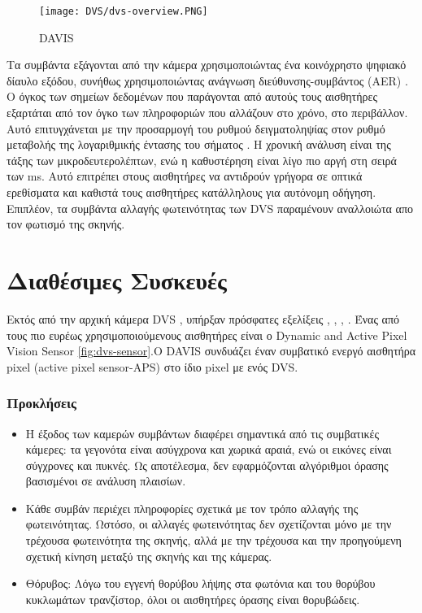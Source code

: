\documentclass[12pt]{report}
\begin{document}
\begin{wrapfigure}{r}{0.5\textwidth} %
    \centering
     \texttt{[image: DVS/dvs-overview.PNG]}
    \caption{\textlatin{DAVIS}}
    \label{fig:dvs-overview}
\end{wrapfigure}
Τα συμβάντα εξάγονται από την κάμερα χρησιμοποιώντας ένα κοινόχρηστο ψηφιακό δίαυλο εξόδου, συνήθως χρησιμοποιώντας ανάγνωση διεύθυνσης-συμβάντος (\textlatin{AER}) \cite{boahen2004} \cite{liu2015}. Ο όγκος των σημείων δεδομένων που παράγονται από αυτούς τους αισθητήρες εξαρτάται από τον όγκο των πληροφοριών που αλλάζουν στο χρόνο, στο περιβάλλον. Αυτό επιτυγχάνεται με την προσαρμογή του ρυθμού δειγματοληψίας στον ρυθμό μεταβολής της λογαριθμικής έντασης του σήματος . Η χρονική ανάλυση είναι της τάξης των μικροδευτερολέπτων, ενώ η καθυστέρηση είναι λίγο πιο αργή στη σειρά των \textlatin{ms}. Αυτό επιτρέπει στους αισθητήρες να αντιδρούν γρήγορα σε οπτικά ερεθίσματα και καθιστά τους αισθητήρες κατάλληλους για αυτόνομη οδήγηση. Επιπλέον, τα συμβάντα αλλαγής φωτεινότητας των \textlatin{DVS} παραμένουν αναλλοιώτα απο τον φωτισμό της σκηνής.

\section{Διαθέσιμες Συσκευές}

Εκτός από την αρχική κάμερα \textlatin{DVS} \cite{Lichtsteiner2008}, υπήρξαν πρόσφατες εξελίξεις \cite{posch2014} , \cite{liu2015}, \cite{indiveri2015}, \cite{delbruck2010} .
Ένας από τους πιο ευρέως χρησιμοποιούμενους αισθητήρες είναι ο \textlatin{Dynamic and Active Pixel Vision Sensor} \cite{davis} \ref{fig:dvs-sensor}.Ο \textlatin{DAVIS } συνδυάζει έναν συμβατικό ενεργό αισθητήρα pixel (\textlatin{active pixel sensor}-\textlatin{APS})  \cite{fossum1997}  στο ίδιο \textlatin{pixel} με ενός \textlatin{DVS}.
\subsubsection{Προκλήσεις}
\begin{itemize}
    \item Η έξοδος των καμερών συμβάντων διαφέρει σημαντικά από τις συμβατικές κάμερες: τα γεγονότα είναι ασύγχρονα και χωρικά αραιά, ενώ οι εικόνες είναι σύγχρονες και πυκνές. Ως αποτέλεσμα, δεν εφαρμόζονται αλγόριθμοι όρασης βασισμένοι σε ανάλυση πλαισίων.
    \item Κάθε συμβάν περιέχει πληροφορίες σχετικά με τον τρόπο αλλαγής της φωτεινότητας. Ωστόσο, οι αλλαγές φωτεινότητας δεν σχετίζονται μόνο με την τρέχουσα φωτεινότητα της σκηνής, αλλά με την τρέχουσα και την προηγούμενη σχετική κίνηση μεταξύ της σκηνής και της κάμερας.
    \item Θόρυβος: Λόγω του εγγενή θορύβου λήψης στα φωτόνια και του θορύβου κυκλωμάτων τρανζίστορ, όλοι οι αισθητήρες όρασης είναι θορυβώδεις.
\end{itemize}
\end{document}
